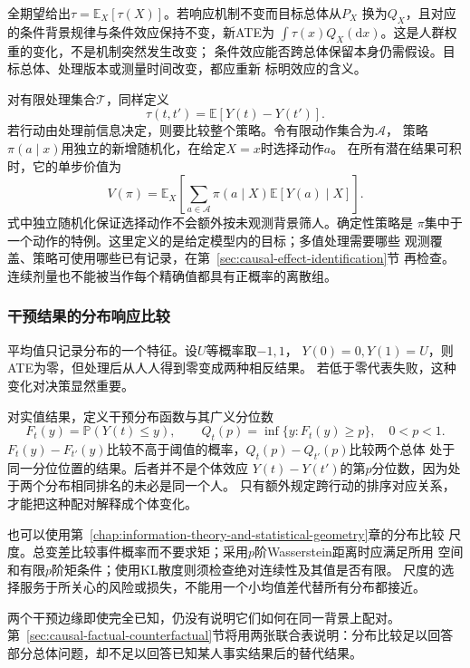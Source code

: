全期望给出\(\tau=\mathbb E_X[\tau(X)]\)。若响应机制不变而目标总体从\(P_X\)
换为\(Q_X\)，且对应的条件背景规律与条件效应保持不变，新ATE为
\(\int\tau(x)Q_X(\mathrm dx)\)。这是人群权重的变化，不是机制突然发生改变；
条件效应能否跨总体保留本身仍需假设。目标总体、处理版本或测量时间改变，都应重新
标明效应的含义。

对有限处理集合\(\mathcal T\)，同样定义
\[
  \tau(t,t')=\mathbb E[Y(t)-Y(t')].
\]
若行动由处理前信息决定，则要比较整个策略。令有限动作集合为\(\mathcal A\)，
策略\(\pi(a\mid x)\)用独立的新增随机化，在给定\(X=x\)时选择动作\(a\)。
在所有潜在结果可积时，它的单步价值为
\begin{equation}
  V(\pi)=\mathbb E_X\left[
    \sum_{a\in\mathcal A}\pi(a\mid X)\mathbb E[Y(a)\mid X]
  \right].
  \label{eq:causal-policy-value}
\end{equation}
式中独立随机化保证选择动作不会额外按未观测背景筛人。确定性策略是
\(\pi\)集中于一个动作的特例。这里定义的是给定模型内的目标；多值处理需要哪些
观测覆盖、策略可使用哪些已有记录，在第~\ref{sec:causal-effect-identification}节
再检查。连续剂量也不能被当作每个精确值都具有正概率的离散组。

\subsubsection{干预结果的分布响应比较}
\label{sec:causal-distribution-response}

平均值只记录分布的一个特征。设\(U\)等概率取\(-1,1\)，
\(Y(0)=0,Y(1)=U\)，则ATE为零，但处理后从人人得到零变成两种相反结果。
若低于零代表失败，这种变化对决策显然重要。

对实值结果，定义干预分布函数与其广义分位数
\[
  F_t(y)=\mathbb P(Y(t)\leq y),\qquad
  Q_t(p)=\inf\{y:F_t(y)\geq p\},\quad 0<p<1.
\]
\(F_t(y)-F_{t'}(y)\)比较不高于阈值的概率，\(Q_t(p)-Q_{t'}(p)\)比较两个总体
处于同一分位位置的结果。后者并不是个体效应
\(Y(t)-Y(t')\)的第\(p\)分位数，因为处于两个分布相同排名的未必是同一个人。
只有额外规定跨行动的排序对应关系，才能把这种配对解释成个体变化。

也可以使用第~\ref{chap:information-theory-and-statistical-geometry}章的分布比较
尺度。总变差比较事件概率而不要求矩；采用\(p\)阶Wasserstein距离时应满足所用
空间和有限\(p\)阶矩条件；使用KL散度则须检查绝对连续性及其值是否有限。
尺度的选择服务于所关心的风险或损失，不能用一个小均值差代替所有分布都接近。

两个干预边缘即使完全已知，仍没有说明它们如何在同一背景上配对。
第~\ref{sec:causal-factual-counterfactual}节将用两张联合表说明：分布比较足以回答
部分总体问题，却不足以回答已知某人事实结果后的替代结果。

